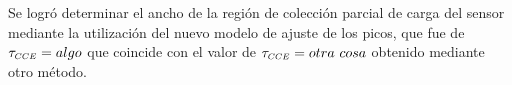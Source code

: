 Se logró determinar el ancho de la región de colección parcial de carga del sensor mediante la utilización del nuevo modelo de ajuste de los picos, que fue de $\tau_{\scaleto{CCE}{4pt}} = algo$ que coincide con el valor de $\tau_{\scaleto{CCE}{4pt}} = otra\ cosa$ obtenido mediante otro método.



